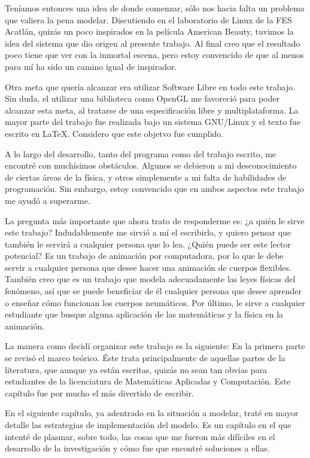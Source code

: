 Teníamos entonces una idea de donde comenzar, sólo nos hacia falta un problema que valiera la pena modelar. Discutiendo en el laboratorio de Linux de la FES Acatlán, quizás un poco inspirados en la película American Beauty, tuvimos la idea del sistema que dio origen al presente trabajo. Al final creo que el resultado poco tiene que ver con la inmortal escena, pero estoy convencido de que al menos para mí ha sido un camino igual de inspirador.

Otra meta que quería alcanzar era utilizar Software Libre en todo este trabajo. Sin duda, el utilizar una biblioteca como OpenGL me favoreció para poder alcanzar esta meta, al tratarse de una especificación libre y multiplataforma. La mayor parte del trabajo fue realizada bajo un sistema GNU/Linux y el texto fue escrito en \LaTeX. Considero que este objetvo fue cumplido.

A lo largo del desarrollo, tanto del programa como del trabajo escrito, me encontré con muchísimos obstáculos. Algunos se debieron a mi desconocimiento de ciertas áreas de la física, y otros simplemente a mi falta de habilidades de programación. Sin embargo, estoy convencido que en ambos aspectos este trabajo me ayudó a superarme.

La pregunta más importante que ahora trato de responderme es: ¿a quién le sirve este trabajo? Indudablemente me sirvió a mí el escribirlo, y quiero pensar que también le servirá a cualquier persona que lo lea. ¿Quién puede ser este lector potencial? Es un trabajo de animación por computadora, por lo que le debe servir a cualquier persona que desee hacer una animación de cuerpos flexibles. También creo que es un trabajo que modela adecuadamente las leyes físicas del fenómeno, así que se puede beneficiar de él cualquier persona que desee aprender o enseñar cómo funcionan los cuerpos neumáticos. Por último, le sirve a cualquier estudiante que busque alguna aplicación de las matemáticas y la física en la animación.

La manera como decidí organizar este trabajo es la siguiente:
En la primera parte se revisó el marco teórico. Éste trata principalmente de aquellas partes de la literatura, que aunque ya están escritas, quizás no sean tan obvias para estudiantes de la licenciatura de Matemáticas Aplicadas y Computación. Este capítulo fue por mucho el más divertido de escribir.

En el siguiente capítulo, ya adentrado en la situación a modelar, traté en mayor detalle las estrategias de implementación del modelo. Es un capítulo en el que intenté de plasmar, sobre todo, las cosas que me fueron más difíciles en el desarrollo de la investigación y cómo fue que encontré soluciones a ellas.

